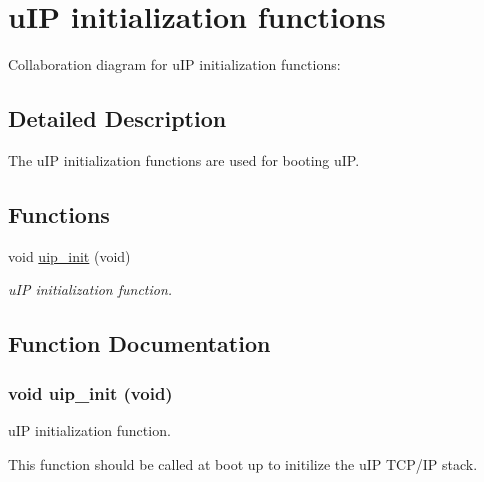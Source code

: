 \hypertarget{a00062}{
\section{u\-IP initialization functions}
\label{a00062}
}


Collaboration diagram for u\-IP initialization functions:

\subsection{Detailed Description}
The u\-IP initialization functions are used for booting u\-IP. 



\subsection*{Functions}
\begin{CompactItemize}
\item 
void \hyperlink{a00062_gc48ed5f0d27721ef62a3ed02a5ad8d2e}{uip\_\-init} (void)
\begin{CompactList}\small\item\em u\-IP initialization function. \item\end{CompactList}\end{CompactItemize}


\subsection{Function Documentation}
\hypertarget{a00062_gc48ed5f0d27721ef62a3ed02a5ad8d2e}{
\subsubsection[uip\_\-init]{\setlength{\rightskip}{0pt plus 5cm}void uip\_\-init (void)}}
\label{a00062_gc48ed5f0d27721ef62a3ed02a5ad8d2e}


u\-IP initialization function. 

This function should be called at boot up to initilize the u\-IP TCP/IP stack. 